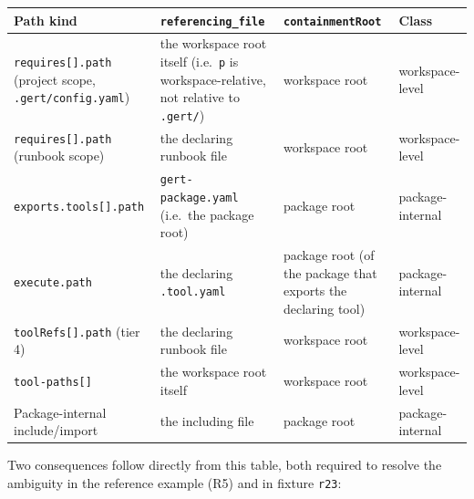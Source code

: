 \begin{center}\small
\begin{tabular}{p{3.4cm}p{4.6cm}p{3.9cm}p{1.6cm}}
\hline
\textbf{Path kind} & \textbf{\texttt{referencing\_file}} & \textbf{\texttt{containmentRoot}} & \textbf{Class} \\
\hline
\texttt{requires[].path} (project scope, \texttt{.gert/config.yaml}) &
  the workspace root itself (i.e.\ \texttt{p} is workspace-relative, not
  relative to \texttt{.gert/}) &
  workspace root &
  workspace-level \\
\texttt{requires[].path} (runbook scope) &
  the declaring runbook file &
  workspace root &
  workspace-level \\
\texttt{exports.tools[].path} &
  \texttt{gert-package.yaml} (i.e.\ the package root) &
  package root &
  package-internal \\
\texttt{execute.path} &
  the declaring \texttt{.tool.yaml} &
  package root (of the package that exports the declaring tool) &
  package-internal \\
\texttt{toolRefs[].path} (tier 4) &
  the declaring runbook file &
  workspace root &
  workspace-level \\
\texttt{tool-paths[]} &
  the workspace root itself &
  workspace root &
  workspace-level \\
Package-internal include/import &
  the including file &
  package root &
  package-internal \\
\hline
\end{tabular}
\label{tab:tool-path-bases}
\end{center}

Two consequences follow directly from this table, both required to resolve
the ambiguity in the reference example (R5) and in fixture \texttt{r23}:

